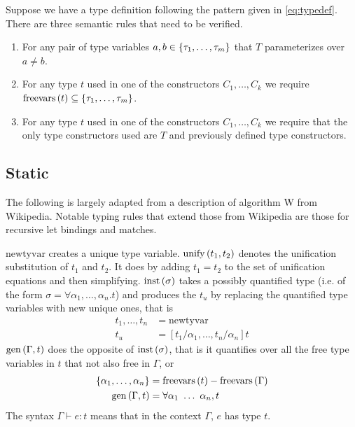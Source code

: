 \documentclass[12pt]{article}
\newcommand{\newtyvar}{\mathrm{newtyvar}}
\newcommand{\inst}[1]{\mathrm{inst}\del{#1}}
\newcommand{\gen}[2]{\mathrm{gen}\del{#1, #2}}
\newcommand{\freevars}[1]{\mathrm{freevars}\del{#1}}
\newcommand{\unify}[2]{\mathrm{unify}\del{#1, #2}}
\begin{document}
Suppose we have a type definition following the pattern given in
\eqref{eq:typedef}.
There are three semantic rules that need to be verified.
\begin{enumerate}
\item For any pair of type variables
  $a, b \in \cbr{\tau_1,\ldots,\tau_m}$ that $T$ parameterizes over
  $a \neq b$.

\item For any type $t$ used in one of the constructors
  $C_1,\ldots,C_k$ we require
  $\freevars{t} \subseteq \cbr{\tau_1,\ldots,\tau_m}$.

\item For any type $t$ used in one of the constructors
  $C_1,\ldots,C_k$ we require that the only type constructors used are
  $T$ and previously defined type constructors.
\end{enumerate}


\subsection{Static}
\label{sec:static_semantics}

The following is largely adapted from a description of algorithm W
from Wikipedia\cite{wikiAlgW}.
Notable typing rules that extend those from Wikipedia are those for
recursive let bindings and matches.

$\newtyvar$ creates a unique type variable.
$\unify{t_1}{t_2}$ denotes the unification substitution of $t_1$ and
$t_2$.
It does by adding $t_1 = t_2$ to the set of unification equations and
then simplifying.
$\inst{\sigma}$ takes a possibly quantified type (i.e. of the form
$\sigma = \forall \alpha_1, \ldots, \alpha_n. t$) and produces the
$t_u$ by replacing the
quantified type variables with new unique ones, that is
\begin{align*}
  t_1,\ldots,t_n &= \newtyvar\\
  t_u &= [t_1/\alpha_1, \ldots, t_n/\alpha_n] t
\end{align*}
$\gen{\Gamma}{t}$ does the opposite of $\inst{\sigma}$, that is it
quantifies over all the free type variables in $t$ that not also free
in $\Gamma$, or
\begin{align*}
  \cbr{\alpha_1, \ldots, \alpha_n} &= \freevars{t} - \freevars{\Gamma}\\
  \gen{\Gamma}{t} &= \forall \alpha_1~\ldots~\alpha_n, t
\end{align*}
The syntax $\Gamma \vdash e : t$ means that in the context
$\Gamma$, $e$ has type $t$.
\end{document}
